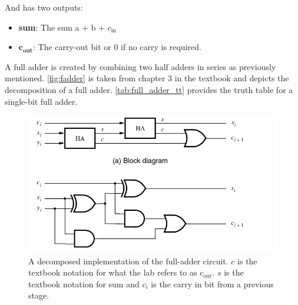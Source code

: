 \documentclass[12pt]{betterjournal}
\begin{document}
And has two outputs:

\begin{itemize}
    \item \textbf{sum}: The sum a + b + $c_\text{in}$
    \item $\textbf{c}_\textbf{out}$: The carry-out bit or 0 if no carry is required.
\end{itemize}

A full adder is created by combining two half adders in series as previously mentioned. \autoref{fig:fadder} is taken from chapter 3 in the textbook and depicts the decomposition of a full adder. \autoref{tab:full_adder_tt} provides the truth table for a single-bit full adder.
\begin{figure}
    \centering
    \includegraphics[width=1\linewidth]{fulladderdiagram.png}
    \caption{A decomposed implementation of the full-adder circuit. $c$ is the textbook notation for what the lab refers to as $\text{c}_\text{out}$. $s$ is the textbook notation for sum and $c_i$ is the carry in bit from a previous stage.}
    \label{fig:fadder}
\end{figure}
\end{document}
